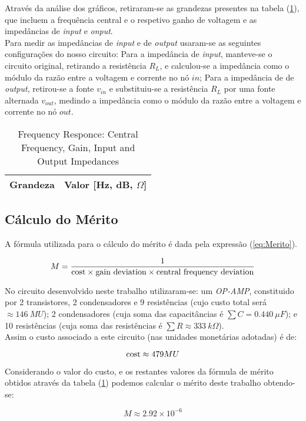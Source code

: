Através da análise dos gráficos, retiraram-se as grandezas presentes na tabela (\ref{tab:SimValues}), que
incluem a frequência central e o respetivo ganho de voltagem e as impedâncias de \emph{input} e \emph{onput}.
\\
Para medir as impedâncias de \emph{input} e de \emph{output} usaram-se as seguintes configurações do nosso circuito:
Para a impedância de \emph{input}, manteve-se o circuito original, retirando a resistência $R_L$, e calculou-se
a impedância como o módulo da razão entre a voltagem e corrente no nó $in$; Para a impedância de de \emph{output},
retirou-se a fonte $v_{in}$ e substituiu-se a resistência $R_L$ por uma fonte alternada $v_{out}$, medindo a impedância
como o módulo da razão entre a voltagem e corrente no nó $out$.

\begin{table}[H]
    \centering
    \begin{tabular}{|l|r|}
    \hline    
    {\bf Grandeza} & {\bf Valor [Hz, dB, $\Omega$]} \\ \hline
    
    
    
    \end{tabular}
    \caption{Frequency Responce: Central Frequency, Gain, Input and Output Impedances}
    \label{tab:SimValues}
\end{table}


\subsection{Cálculo do Mérito}

A fórmula utilizada para o cálculo do mérito é dada pela expressão (\ref{eq:Merito}).

\begin{equation}
    M = \frac{1}{\textnormal{cost} \times \textnormal{gain deviation} \times \textnormal{central frequency deviation}}
    \label{eq:Merito}
\end{equation}

No circuito desenvolvido neste trabalho utilizaram-se: um \emph{OP-AMP}, constituido por 2 transistores, 2 condensadores e
9 resistências (cujo custo total será $\approx 146 \: MU$); 2 condensadores (cuja soma das capacitâncias é $\sum C = 0.440 \: \mu F$);
e 10 resistências (cuja soma das resistências é $\sum R \approx 333 \: k\Omega$).
\\
Assim o custo associado a este circuito (nas unidades monetárias adotadas) é de:

\begin{equation}
  \label{eq:Custo}
  \textnormal{cost} \approx 479 MU
\end{equation}

Considerando o valor do custo, e os restantes valores da fórmula de mérito obtidos através da tabela (\ref{tab:SimValues})
podemos calcular o mérito deste trabalho obtendo-se:

\begin{equation}
  \label{eq:ValorMerito}
  M \approx 2.92 \times 10^{- 6}
\end{equation}
